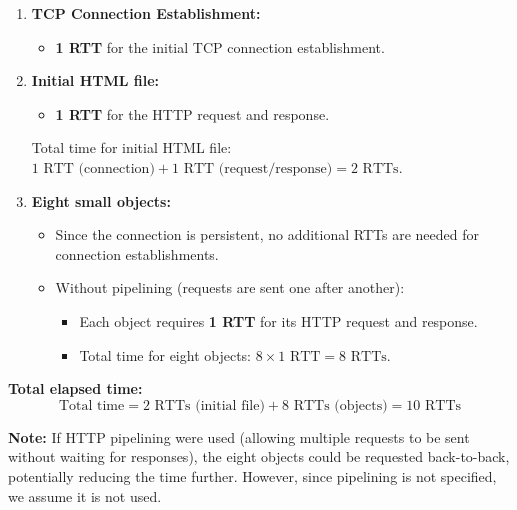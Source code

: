 \documentclass{cshwk}
\begin{document}
    \begin{enumerate}
        \item \textbf{TCP Connection Establishment:}
        \begin{itemize}
            \item \textbf{1 RTT} for the initial TCP connection establishment.
        \end{itemize}
        
        \item \textbf{Initial HTML file:}
        \begin{itemize}
            \item \textbf{1 RTT} for the HTTP request and response.
        \end{itemize}
        Total time for initial HTML file: \( 1 \text{ RTT (connection)} + 1 \text{ RTT (request/response)} = 2 \text{ RTTs} \).
        
        \item \textbf{Eight small objects:}
        \begin{itemize}
            \item Since the connection is persistent, no additional RTTs are needed for connection establishments.
            \item Without pipelining (requests are sent one after another):
                \begin{itemize}
                    \item Each object requires \textbf{1 RTT} for its HTTP request and response.
                    \item Total time for eight objects: \( 8 \times 1 \text{ RTT} = 8 \text{ RTTs} \).
                \end{itemize}
        \end{itemize}
    \end{enumerate}

    \noindent \textbf{Total elapsed time:}
    \[
    \text{Total time} = 2 \text{ RTTs (initial file)} + 8 \text{ RTTs (objects)} = \boxed{10 \text{ RTTs}}
    \]

    \noindent \textbf{Note:} If HTTP pipelining were used (allowing multiple requests to be sent without waiting for responses), the eight objects could be requested back-to-back, potentially reducing the time further. However, since pipelining is not specified, we assume it is not used.
\end{document}
